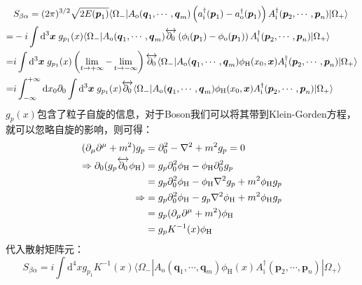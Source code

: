 	\begin{align}
	&S_{\beta\alpha}=(2\pi)^{3/2}\sqrt{2E(\boldsymbol{p}_1)}\langle\Omega_-|A_{\text{o}}(\boldsymbol{q}_1,\cdots,\boldsymbol{q}_m)\left(a^\dagger_{\text{i}}(\boldsymbol{p}_1)-a^\dagger_{\text{o}}(\boldsymbol{p}_1)\right)A^\dagger_{\text{i}}(\boldsymbol{p}_2,\cdots,\boldsymbol{p}_n)|\Omega_+\rangle\notag\\
	=&-i\int\mathrm{d}^3\boldsymbol{x}\;g_{{p}_1}(x)\langle\Omega_-|A_{\text{o}}(\boldsymbol{q}_1,\cdots,\boldsymbol{q}_m)\overleftrightarrow{\partial_0}\left(\phi_{\text{i}}(\boldsymbol{p}_1)-\phi_{\text{o}}(\boldsymbol{p}_1)\right)A^\dagger_{\text{i}}(\boldsymbol{p}_2,\cdots,\boldsymbol{p}_n)|\Omega_+\rangle\notag\\
	=&i\int\mathrm{d}^3\boldsymbol{x}\;g_{{p}_1}(x)\left(\lim\limits_{t\rightarrow+\infty}-\lim\limits_{t\rightarrow-\infty}\right)\overleftrightarrow{\partial_0}\langle\Omega_-|A_{\text{o}}(\boldsymbol{q}_1,\cdots,\boldsymbol{q}_m)\phi_{\text{H}}(x_0,\boldsymbol{x})A^\dagger_{\text{i}}(\boldsymbol{p}_2,\cdots,\boldsymbol{p}_n)|\Omega_+\rangle\notag\\
	=&i\int_{-\infty}^{+\infty}\mathrm{d}x_0\partial_0\int\mathrm{d}^3\boldsymbol{x}\;g_{{p}_1}(x)\overleftrightarrow{\partial_0}\langle\Omega_-|A_{\text{o}}(\boldsymbol{q}_1,\cdots,\boldsymbol{q}_m)\phi_{\text{H}}(x_0,\boldsymbol{x})A^\dagger_{\text{i}}(\boldsymbol{p}_2,\cdots,\boldsymbol{p}_n)|\Omega_+\rangle
	\end{align}
$g_{{p}}(x)$包含了粒子自旋的信息，对于Boson我们可以将其带到Klein-Gorden方程，就可以忽略自旋的影响，则可得：
\begin{align}
(\partial_\mu\partial^\mu+m^2)g_{{p}}&=\partial_0^2-\nabla^2+m^2g_{{p}}=0\\
\Rightarrow	\partial_0(g_{{p}}\overleftrightarrow{\partial_0}\phi_{\text{H}})&=g_{{p}}\partial_0^2\phi_{\text{H}}-\phi_{\text{H}}\partial_0^2g_{{p}}\notag\\
&=g_{{p}}\partial_0^2\phi_{\text{H}}-\phi_{\text{H}}\nabla^2g_{{p}}+m^2\phi_{\text{H}} g_{{p}}\notag\\
\Rightarrow&=g_{{p}}\partial_0^2\phi_{\text{H}}-g_{{p}}\nabla^2\phi_{\text{H}}+m^2\phi_{\text{H}} g_{{p}}\notag\\
&=g_{{p}}(\partial_\mu\partial^\mu+m^2)\phi_{\text{H}}\notag\\
&=g_{{p}}K^{-1}(x)\phi_{\text{H}}
\end{align}
代入散射矩阵元：
\begin{equation}
S_{\beta\alpha}=i\int\mathrm{d}^4x g_{{p}_1}K^{-1}(x)\langle\Omega_-|A_{\text{o}}(\boldsymbol{q}_1,\cdots,\boldsymbol{q}_m)\phi_{\text{H}}(x)A^\dagger_{\text{i}}(\boldsymbol{p}_2,\cdots,\boldsymbol{p}_n)|\Omega_+\rangle
\end{equation}

